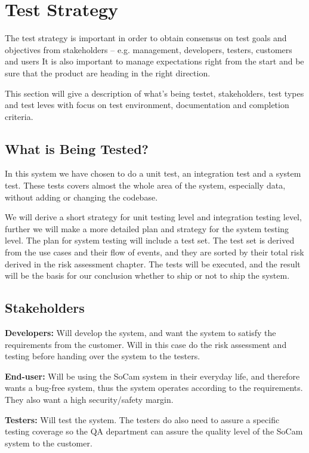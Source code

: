 \chapter{Test Strategy}


	The test strategy is important in order to obtain consensus on test goals and objectives from stakeholders – e.g. management, developers, testers, customers and users It is also important to manage expectations right from the start and be sure that the product are heading in the right direction.

	This section will give a description of what's being testet, stakeholders, test types and test leves with focus on test environment, documentation and completion criteria.

	\clearpage

	\section{What is Being Tested?}

		In this system we have chosen to do a unit test, 
		an integration test and a system test. 
		These tests covers almost the whole area of the system, especially data, without adding 
		or changing the codebase.

		We will derive a short strategy for unit testing level and integration testing level, further we will make a more detailed plan and strategy for the system testing level. The plan for system testing will include a test set. The test set is derived from the use cases and their flow of events, and they are sorted by their total risk derived in the risk assessment chapter. The tests will be executed, and the result will be the basis for our conclusion whether to ship or not to ship the system.

	\section{Stakeholders}

		{\bf Developers:} Will develop the system, and want the system to satisfy the requirements from the customer. Will in this case do the risk assessment and testing before handing over the system to the testers.

		{\bf End-user:} Will be using the SoCam system in their everyday life, and therefore wants a bug-free system, thus the system operates according to the requirements. They also want a high security/safety margin.

		{\bf Testers:} Will test the system. The testers do also need to assure a specific testing coverage so the QA department can assure the quality level of the SoCam system to the customer.   

